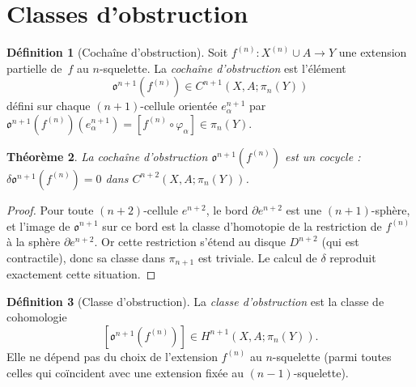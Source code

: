 \documentclass[12pt,a4paper,openany]{book}
\theoremstyle{definition}
\newtheorem{definition}{Définition}[chapter]
\theoremstyle{plain}
\newtheorem{theoreme}[definition]{Théorème}
\theoremstyle{remark}
\begin{document}
\section{Classes d'obstruction}\label{sec:classes-obstruction}

\begin{definition}[Cochaîne d'obstruction]\label{def:cochaine-obstruction}
  Soit $f^{(n)} \colon X^{(n)} \cup A \to Y$ une extension partielle de~$f$
  au $n$-squelette. La \emph{cochaîne d'obstruction} est l'élément
  \[
    \mathfrak{o}^{n+1}(f^{(n)}) \in C^{n+1}(X, A; \pi_n(Y))
  \]
  défini sur chaque $(n+1)$-cellule orientée $e_\alpha^{n+1}$ par
  $\mathfrak{o}^{n+1}(f^{(n)})(e_\alpha^{n+1}) = [f^{(n)} \circ \varphi_\alpha]
  \in \pi_n(Y)$.
\end{definition}

\begin{theoreme}\label{thm:obstruction-cocycle}
  La cochaîne d'obstruction $\mathfrak{o}^{n+1}(f^{(n)})$ est un cocycle :
  $\delta \mathfrak{o}^{n+1}(f^{(n)}) = 0$ dans
  $C^{n+2}(X, A; \pi_n(Y))$.
\end{theoreme}

\begin{proof}
  Pour toute $(n+2)$-cellule $e^{n+2}$, le bord $\partial e^{n+2}$ est une
  $(n+1)$-sphère, et l'image de $\mathfrak{o}^{n+1}$ sur ce bord est la classe
  d'homotopie de la restriction de $f^{(n)}$ à la sphère $\partial e^{n+2}$. Or
  cette restriction s'étend au disque $D^{n+2}$ (qui est contractile), donc sa
  classe dans $\pi_{n+1}$ est triviale. Le calcul de $\delta$ reproduit exactement
  cette situation.
\end{proof}

\begin{definition}[Classe d'obstruction]\label{def:classe-obstruction}
  La \emph{classe d'obstruction} est la classe de cohomologie
  \[
    [\mathfrak{o}^{n+1}(f^{(n)})] \in H^{n+1}(X, A; \pi_n(Y)).
  \]
  Elle ne dépend pas du choix de l'extension $f^{(n)}$ au $n$-squelette (parmi
  toutes celles qui coïncident avec une extension fixée au $(n{-}1)$-squelette).
\end{definition}
\end{document}
